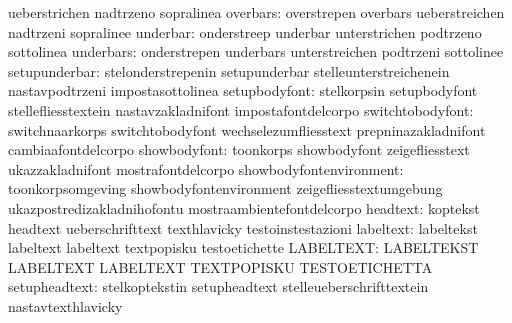                                  ueberstrichen                    nadtrzeno
                                  sopralinea
                        overbars: overstrepen                      overbars
                                  ueberstreichen                   nadtrzeni
                                  sopralinee
                        underbar: onderstreep                      underbar
                                  unterstrichen                    podtrzeno
                                  sottolinea
                       underbars: onderstrepen                     underbars
                                  unterstreichen                   podtrzeni
                                  sottolinee
                   setupunderbar: stelonderstrepenin               setupunderbar
                                  stelleunterstreichenein          nastavpodtrzeni
                                  impostasottolinea
                   setupbodyfont: stelkorpsin                      setupbodyfont
                                  stellefliesstextein              nastavzakladnifont
                                  impostafontdelcorpo
                switchtobodyfont: switchnaarkorps                  switchtobodyfont
                                  wechselezumfliesstext            prepninazakladnifont
                                  cambiaafontdelcorpo
                    showbodyfont: toonkorps                        showbodyfont
                                  zeigefliesstext                  ukazzakladnifont
                                  mostrafontdelcorpo
         showbodyfontenvironment: toonkorpsomgeving                showbodyfontenvironment
                                  zeigefliesstextumgebung          ukazpostredizakladnihofontu
                                  mostraambientefontdelcorpo
                        headtext: koptekst                         headtext
                                  ueberschrifttext                 texthlavicky
                                  testoinstestazioni
                       labeltext: labeltekst                       labeltext
                                  labeltext                        textpopisku
                                  testoetichette
                       LABELTEXT: LABELTEKST                       LABELTEXT
                                  LABELTEXT                        TEXTPOPISKU
                                  TESTOETICHETTA
                   setupheadtext: stelkoptekstin                   setupheadtext
                                  stelleueberschrifttextein        nastavtexthlavicky
